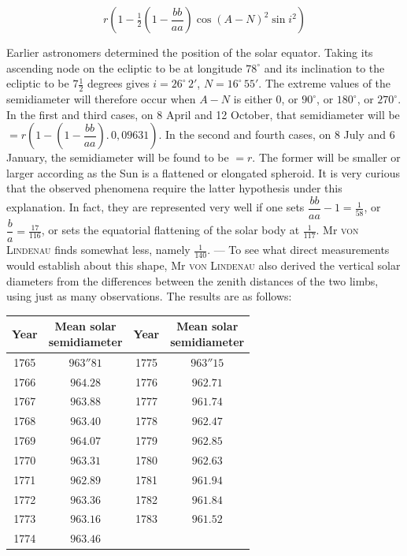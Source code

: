 \[ r\left(1-\tfrac{1}{2}\left(1-\frac{bb}{aa}\right)\cos(A-N)^2\sin i^2\right) \]

Earlier astronomers determined the position of the solar equator. Taking its ascending node on the ecliptic to be at longitude $78^\circ$ and its inclination to the ecliptic to be $7\tfrac{1}{2}$ degrees gives $i = 26^\circ \, 2'$, $N = 16^\circ \, 55'$. The extreme values of the semidiameter will therefore occur when $A-N$ is either $0$, or $90^\circ$, or $180^\circ$, or $270^\circ$. In the first and third cases, on 8 April and 12 October, that semidiameter will be $= r\left(1-\left(1-\dfrac{bb}{aa}\right).\,0{,}09631\right)$. In the second and fourth cases, on 8 July and 6 January, the semidiameter will be found to be $= r$. The former will be smaller or larger according as the Sun is a flattened or elongated spheroid. It is very curious that the observed phenomena require the latter hypothesis under this explanation. In fact, they are represented very well if one sets $\dfrac{bb}{aa}-1 = \tfrac{1}{58}$, or $\dfrac{b}{a} = \tfrac{17}{116}$, or sets the equatorial flattening of the solar body at $\tfrac{1}{117}$. Mr \textsc{von Lindenau} finds somewhat less, namely $\tfrac{1}{140}$. — To see what direct measurements would establish about this shape, Mr \textsc{von Lindenau} also derived the vertical solar diameters from the differences between the zenith distances of the two limbs, using just as many observations. The results are as follows:

\begin{center}\begin{tabular}{c|c||c|c}
Year & \shortstack{Mean solar\\semidiameter} & Year & \shortstack{Mean solar\\semidiameter} \\ \hline
1765 & $963''81$ & 1775 & $963''15$ \\
1766 & $964.28$ & 1776 & $962.71$ \\
1767 & $963.88$ & 1777 & $961.74$ \\
1768 & $963.40$ & 1778 & $962.47$ \\
1769 & $964.07$ & 1779 & $962.85$ \\
1770 & $963.31$ & 1780 & $962.63$ \\
1771 & $962.89$ & 1781 & $961.94$ \\
1772 & $963.36$ & 1782 & $961.84$ \\
1773 & $963.16$ & 1783 & $961.52$ \\
1774 & $963.46$ & & \\
\end{tabular}\end{center}

